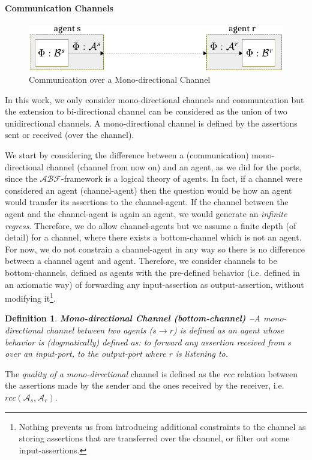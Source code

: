 \documentclass[conference]{IEEEtran}
\newcommand{\assertionRegion}{\mathcal{A}}
\newcommand{\beliefRegion}{\mathcal{B}}
\newcommand{\factRegion}{\mathcal{F}}
\newcommand{\rcc}{rcc}
\newcommand{\abftheory}{\assertionRegion\beliefRegion\factRegion}
\newcommand{\Rcc}[2]{rcc(#1,#2)}
\newtheorem{definition}{Definition}%
\begin{document}
\paragraph{Communication Channels}
\begin{figure}[t]
	\centering
	\includegraphics[width=\columnwidth]{channel.pdf}
	\caption{Communication over a Mono-directional Channel}
	\label{fig:channel}
\end{figure}
In this work, we only consider
mono-directional channels and communication but the extension to bi-directional
channel can be considered as the union of two unidirectional channels. A
mono-directional channel is defined by the assertions sent or received (over
the channel). 

We start by considering the difference between a (communication)
mono-directional channel (channel from now on) and an agent, as we did for the
ports, since the $\abftheory$-framework is a logical theory of agents.  In fact, if a channel
were considered an agent (channel-agent) then the question would be how an
agent would transfer its assertions to the channel-agent. If the channel
between the agent and the channel-agent is again an agent, we would generate an
\emph{infinite regress}. Therefore, we do allow channel-agents but we assume a
finite depth (of detail) for a channel, where there exists a bottom-channel
which is not an agent. For now, we do not constrain a channel-agent in any way
so there is no difference between a channel agent and agent. Therefore,
we consider channels to be bottom-channels,
defined as agents with the pre-defined behavior (i.e. defined in an axiomatic
way) of forwarding any input-assertion as output-assertion, without modifying it\footnote{Nothing
prevents us from introducing additional constraints to the channel as storing
assertions that are transferred over the channel, or filter out some
input-assertions.}. 

\begin{definition}{\bf Mono-directional Channel (bottom-channel) --}\label{def:monochannel}
	A mono-directional channel between two agents ($s \rightarrow r$) is
	defined as an agent whose behavior is (dogmatically) defined as: to
	forward any assertion received from $s$ over an input-port, to  the
	output-port where $r$ is listening to.
\end{definition}
The \emph{quality of a mono-directional} channel is defined as the $\rcc$
relation between the assertions made by the sender and the ones received by the
receiver, i.e. $\Rcc{\assertionRegion_s}{\assertionRegion_r}$.
\end{document}
